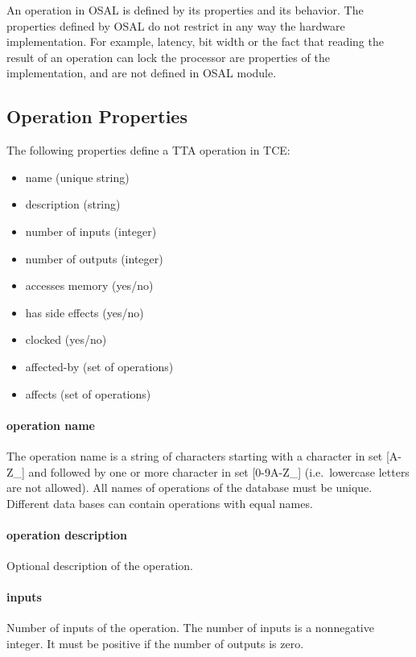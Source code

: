 \documentclass[twoside]{tceusermanual}
\begin{document}
An operation in OSAL is defined by its properties
and its behavior.  The properties defined by OSAL do not restrict in any
way the hardware implementation.  For example, latency, bit width or the
fact that reading the result of an operation can lock the processor are
properties of the implementation, and are not defined in OSAL module.

\subsection{Operation Properties}
\label{ssec:operation-properties}

The following properties define a TTA operation in TCE:

\begin{itemize}
\item name (unique string)
\item description (string)
\item number of inputs (integer)
\item number of outputs (integer)
\item accesses memory (yes/no)
\item has side effects (yes/no)
\item clocked (yes/no)
\item affected-by (set of operations)
\item affects (set of operations)
\end{itemize}

\paragraph{operation name}
The operation name is a string of characters starting with a character in
set [A-Z\_] and followed by one or more character in set [0-9A-Z\_] 
(i.e.\ lowercase letters are not allowed).  All
names of operations of the database must be unique. Different data bases 
can contain operations with equal names. 

\paragraph{operation description}
Optional description of the operation.

\paragraph{inputs}
Number of inputs of the operation. The number of inputs is a
nonnegative integer. It must be positive if the number of outputs is
zero.
\end{document}
